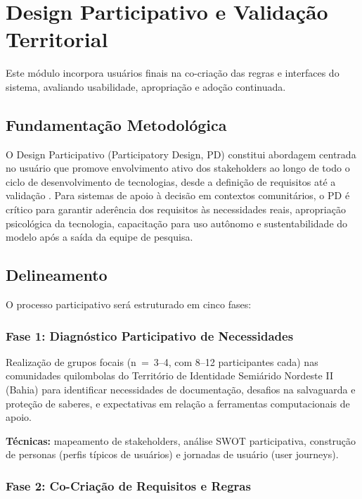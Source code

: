 \section{Design Participativo e Validação Territorial}

Este módulo incorpora usuários finais na co-criação das regras e interfaces do sistema, avaliando usabilidade, apropriação e adoção continuada.

\subsection{Fundamentação Metodológica}

O Design Participativo (Participatory Design, PD) constitui abordagem centrada no usuário que promove envolvimento ativo dos stakeholders ao longo de todo o ciclo de desenvolvimento de tecnologias, desde a definição de requisitos até a validação \cite{Schuler1993,Simonsen2012}. Para sistemas de apoio à decisão em contextos comunitários, o PD é crítico para garantir aderência dos requisitos às necessidades reais, apropriação psicológica da tecnologia, capacitação para uso autônomo e sustentabilidade do modelo após a saída da equipe de pesquisa.

\subsection{Delineamento}

O processo participativo será estruturado em cinco fases:

\subsubsection{Fase 1: Diagnóstico Participativo de Necessidades}

Realização de grupos focais (n~=~3--4, com 8--12 participantes cada) nas comunidades quilombolas do Território de Identidade Semiárido Nordeste II (Bahia) para identificar necessidades de documentação, desafios na salvaguarda e proteção de saberes, e expectativas em relação a ferramentas computacionais de apoio.

\textbf{Técnicas:} mapeamento de stakeholders, análise SWOT participativa, construção de personas (perfis típicos de usuários) e jornadas de usuário (user journeys).

\subsubsection{Fase 2: Co-Criação de Requisitos e Regras}

